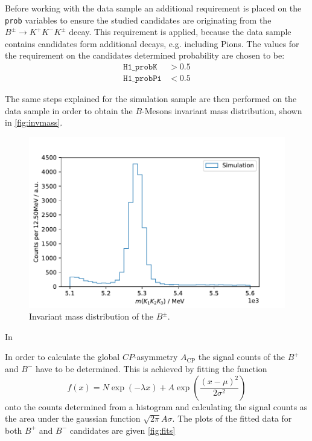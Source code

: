 Before working with the data sample an additional requirement is placed on the \texttt{prob} variables to ensure the studied candidates are originating from the $B^\pm \rightarrow K^+ K^- K^\pm$ decay. This requirement is applied, because the data sample contains candidates form additional decays, e.g. including Pions. The values for the requirement on the candidates determined probability are chosen to be: 
\begin{align}
	\mathtt{H1\_probK} &> 0.5\\
	\mathtt{H1\_probPi} &< 0.5
\end{align}

The same steps explained for the simulation sample are then performed on the data sample in order to obtain the $B$-Mesons invariant mass distribution, shown in \autoref{fig:invmass}. 

\begin{figure}
	\centering
	\includegraphics[width=0.6\linewidth]{content/pictures/image_fin/invmass}
	\caption{Invariant mass distribution of the $B^\pm$.}
	\label{fig:invmass}
\end{figure}
In 

In order to calculate the global $CP$-asymmetry $A_\mathrm{CP}$ the signal counts of the $B^+$ and $B^-$ have to be determined. This is achieved by fitting the function 
\begin{equation}
	f(x) = N\exp\left(-\lambda x\right) + A  \exp\left(\frac{(x-\mu)^2}{2\sigma^2}\right)
	\label{eq:fit}
\end{equation} 
onto the counts determined from a histogram and calculating the signal counts as the area under the gaussian function $\sqrt{2\pi}A\sigma$. The plots of the fitted data for both $B^+$ and $B^-$ candidates are given \autoref{fig:fits}


